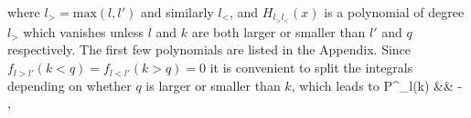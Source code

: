                                                                                                                                                                                                                                                                             \label{foffdiag}
                                                                                                                                                                                                                                                                            \eeq
                                                                                                                                                                                                                                                                            where $l_{>}=\mathrm{max}(l,l')$ and similarly $l_<$, and  $H_{l_>l_<}(x)$ is a polynomial of degree $l_>$ which vanishes unless $l$ and $k$ are both larger or  smaller than $l'$ and $q$ respectively. The first few polynomials are listed in the Appendix. Since $f_{l>l'}(k<q) = f_{l<l'}(k>q)=0$ it is convenient to split the integrals depending on whether $q$ is larger or smaller than $k$, which leads to
                                                                                                                                                                                                                                                                            \beqa
                                                                                                                                                                                                                                                                            \Delta P^_l(k) &\approx & - ,
                                                                                                                                                                                                                                                                            \label{DeltaPell2}
